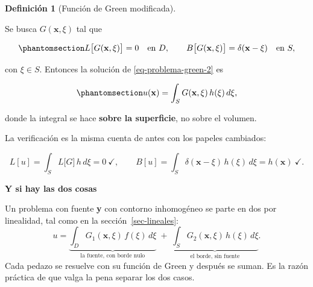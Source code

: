 \documentclass[
  spanish,
  a4paper,
]{scrbook}
\theoremstyle{definition}
\newtheorem{definition}{Definición}[chapter]
\theoremstyle{plain}
\theoremstyle{definition}
\theoremstyle{plain}
\theoremstyle{definition}
\theoremstyle{remark}
\begin{document}
\begin{definition}[Función de Green
modificada]\protect\hypertarget{def-green-modificada}{}\label{def-green-modificada}

Se busca \(G(\mathbf{x},\xi)\) tal que

\begin{equation}\protect\phantomsection\label{eq-def-green-2}{
L\big[G(\mathbf{x},\xi)\big] = 0 \quad\text{en } D, \qquad
B\big[G(\mathbf{x},\xi)\big] = \delta(\mathbf{x}-\xi) \quad\text{en } S ,
}\end{equation}

con \(\xi \in S\). Entonces la solución de \ref{eq-problema-green-2} es

\begin{equation}\protect\phantomsection\label{eq-solucion-green-2}{
u(\mathbf{x}) = \int_S G(\mathbf{x},\xi)\,h(\xi)\,d\xi ,
}\end{equation}

donde la integral se hace \textbf{sobre la superficie}, no sobre el
volumen.

\end{definition}

La verificación es la misma cuenta de antes con los papeles cambiados:

\[
L[u] = \int_S L\big[G\big]\,h\,d\xi = 0 \ \checkmark, \qquad
B[u] = \int_S \delta(\mathbf{x}-\xi)\,h(\xi)\,d\xi = h(\mathbf{x}) \ \checkmark .
\]

\begin{tcolorbox}[enhanced jigsaw, arc=.35mm, bottomrule=.15mm, breakable, colback=white, colframe=quarto-callout-tip-color-frame, left=2mm, leftrule=.75mm, opacityback=0, rightrule=.15mm, toprule=.15mm]
\begin{minipage}[t]{5.5mm}
\textcolor{quarto-callout-tip-color}{\faLightbulb}
\end{minipage}%
\begin{minipage}[t]{\textwidth - 5.5mm}

\vspace{-3mm}\textbf{Y si hay las dos cosas}\vspace{3mm}

Un problema con fuente \textbf{y} con contorno inhomogéneo se parte en
dos por linealidad, tal como en la sección~\ref{sec-lineales}: \[
u = \underbrace{\int_D G_1(\mathbf{x},\xi)\,f(\xi)\,d\xi}_{\text{la fuente, con borde nulo}}
\;+\;
\underbrace{\int_S G_2(\mathbf{x},\xi)\,h(\xi)\,d\xi}_{\text{el borde, sin fuente}} .
\] Cada pedazo se resuelve con su función de Green y después se suman.
Es la razón práctica de que valga la pena separar los dos casos.

\end{minipage}%
\end{tcolorbox}
\end{document}
